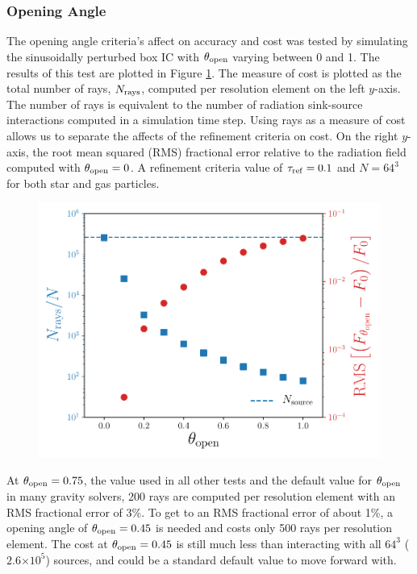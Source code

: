 \documentclass[fleq,usenatbib]{mnras}
\providecommand{\e}[1]{\ensuremath{\times10^{#1}}}
\newcommand{\tr}{\tau_{\rm ref}}
\newcommand{\tO}{\theta_{\rm open}}
\begin{document}
\subsubsection{Opening Angle}
The opening angle criteria's affect on accuracy and cost was tested by 
simulating the sinusoidally perturbed box IC with $\tO$ varying 
between 0 and 1. The results of this test are plotted in Figure 
\ref{fig:openangle}. The measure of cost is plotted as the total number of 
rays, $N_{\rm rays}$, computed per resolution element on the left $y$-axis. 
The number of rays is equivalent to the number of radiation sink-source 
interactions computed in a simulation time step. Using rays as a measure of 
cost allows us to separate the affects of the refinement criteria on cost. On 
the right $y$-axis, the root mean squared (RMS) fractional error relative to 
the radiation field computed with $\tO=0$. A refinement criteria 
value of $\tr = 0.1$ and $N=64^3$ for both star and gas particles.
\begin{figure}
\includegraphics[width=1\linewidth]{Figures/opening_angle.pdf}
\caption{}
\label{fig:openangle}
\end{figure}

At $\tO=0.75$, the value used in all other tests and the 
default value for $\tO$ in many gravity solvers, 200 rays are 
computed per resolution element with an RMS fractional error of 3\%. To get to 
an RMS fractional error of about 1\%, a opening angle of $\tO=0.45$ is needed 
and costs only 500 rays per resolution element. The cost at 
$\tO=0.45$ is still much less than interacting with all $64^3$ 
($2.6\e{5}$) sources, and could be a standard default value to move forward 
with.
\end{document}
